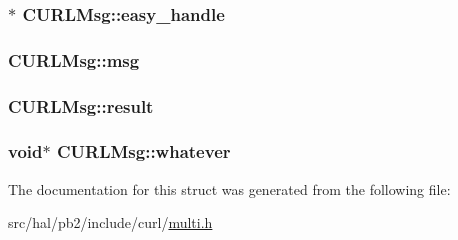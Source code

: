 \subsubsection[{\texorpdfstring{easy\+\_\+handle}{easy_handle}}]{$\ast$ C\+U\+R\+L\+Msg\+::easy\+\_\+handle}\hypertarget{struct_c_u_r_l_msg_a236add50fa3dc85360e4aa7a85a9dfd1}{}\label{struct_c_u_r_l_msg_a236add50fa3dc85360e4aa7a85a9dfd1}
\subsubsection[{\texorpdfstring{msg}{msg}}]{ C\+U\+R\+L\+Msg\+::msg}\hypertarget{struct_c_u_r_l_msg_a805019ce36cd301163b184308220c601}{}\label{struct_c_u_r_l_msg_a805019ce36cd301163b184308220c601}
\subsubsection[{\texorpdfstring{result}{result}}]{ C\+U\+R\+L\+Msg\+::result}\hypertarget{struct_c_u_r_l_msg_ac00f26a84ebe0c2c5cb420a47d15ffec}{}\label{struct_c_u_r_l_msg_ac00f26a84ebe0c2c5cb420a47d15ffec}
\subsubsection[{\texorpdfstring{whatever}{whatever}}]{\setlength{\rightskip}{0pt plus 5cm}void$\ast$ C\+U\+R\+L\+Msg\+::whatever}\hypertarget{struct_c_u_r_l_msg_ae493c9ae3084340faf1aaa50ebf4b105}{}\label{struct_c_u_r_l_msg_ae493c9ae3084340faf1aaa50ebf4b105}


The documentation for this struct was generated from the following file\+:\begin{DoxyCompactItemize}
\item 
src/hal/pb2/include/curl/\hyperlink{multi_8h}{multi.\+h}\end{DoxyCompactItemize}
